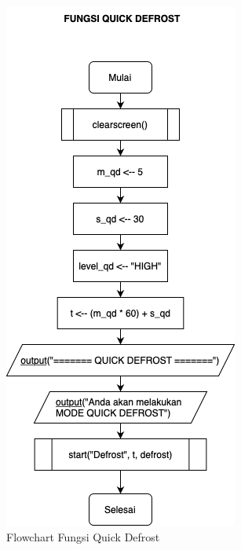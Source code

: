\documentclass[conference]{IEEEtran}
\begin{document}
\begin{figure}[htbp]
    \centering
    \def\svgwidth{\columnwidth}
    \centerline{\includegraphics[scale=0.45]{QuickDefrost.png}}
    \caption{Flowchart Fungsi Quick Defrost}
    \label{fig10}
\end{figure}
\end{document}
